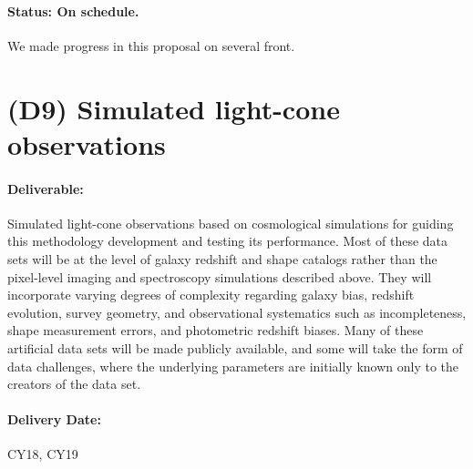 \paragraph*{Status: On schedule.} We made progress in this proposal on several front.






\section*{(D9) Simulated light-cone observations}

\paragraph*{Deliverable:} Simulated light-cone observations based on
cosmological simulations for guiding this methodology development and testing
its performance. Most of these data sets will be at the level of galaxy redshift
and shape catalogs rather than the pixel-level imaging and spectroscopy
simulations described above.  They will incorporate varying degrees of
complexity regarding galaxy bias, redshift evolution, survey geometry, and
observational systematics such as incompleteness, shape measurement errors, and
photometric redshift biases.  Many of these artificial data sets will be made
publicly available, and some will take the form of data challenges, where the
underlying parameters are initially known only to the creators of the data set.

\paragraph*{Delivery Date:} CY18, CY19

